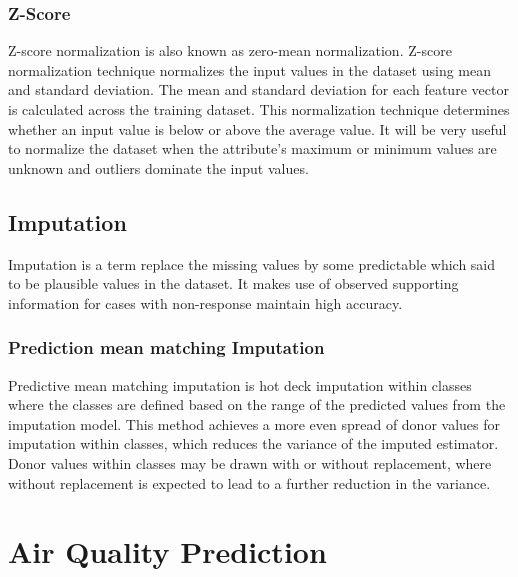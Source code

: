 \subsubsection{Z-Score}
Z-score normalization is also known as zero-mean normalization. Z-score normalization
technique normalizes the input values in the dataset using mean and standard deviation.
The mean and standard deviation for each feature vector is calculated across the training dataset. This normalization technique determines whether an input value is below
or above the average value. It will be very useful to normalize the dataset when the
attribute’s maximum or minimum values are unknown and outliers dominate the input
values.	
\subsection{Imputation}
Imputation is a term replace the missing values by some predictable which said to be
plausible values in the dataset. It makes use of observed supporting information for cases
with non-response maintain high accuracy.
\subsubsection{Prediction mean matching Imputation}
Predictive mean matching imputation is hot deck imputation within classes where the
classes are defined based on the range of the predicted values from the imputation model.
This method achieves a more even spread of donor values for imputation within classes,
which reduces the variance of the imputed estimator. Donor values within classes may
be drawn with or without replacement, where without replacement is expected to lead to
a further reduction in the variance.
\section{Air Quality Prediction}
